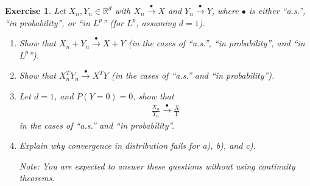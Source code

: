 \documentclass[12pt]{article}
\theoremstyle{colon}
\newtheorem{exercise}{Exercise}
\begin{document}
\clearpage

\begin{exercise}
  Let $X_n, Y_n \in \mathbb{R}^d$ with $X_n \xrightarrow{\bullet} X$ and $Y_n \xrightarrow{\bullet} Y$, where $\bullet$ is either ``a.s.'', ``in probability'', or ``in $L^p$'' (for $L^p$, assuming $d = 1$).
  \begin{enumerate}[label=\alph*)]
    \item Show that $X_n + Y_n \xrightarrow{\bullet} X + Y$ (in the cases of ``a.s.'', ``in probability'', and ``in $L^p$'').
    \item Show that $X_n^T Y_n \xrightarrow{\bullet} X^T Y$ (in the cases of ``a.s.'' and ``in probability'').
    \item Let $d = 1$, and $P(Y = 0) = 0$, show that
      \begin{gather*}
        \frac{X_n}{Y_n} \xrightarrow{\bullet} \frac{X}{Y}
      \end{gather*}
      in the cases of ``a.s.'' and ``in probability''.
    \item Explain why convergence in distribution fails for a), b), and c).

    Note: You are expected to answer these questions without using continuity theorems.
  \end{enumerate}
\end{exercise}
\end{document}

